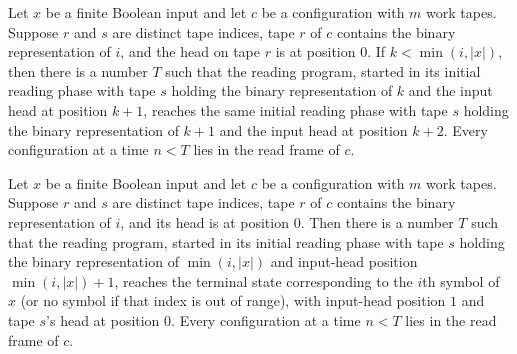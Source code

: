 \begin{theorem}
\label{Complexity.LogProg.read_advance}
\leanok
{}
Let $x$ be a finite Boolean input and let $c$ be a configuration with $m$ work tapes.
Suppose $r$ and $s$ are distinct tape indices, tape $r$ of $c$ contains the binary
representation of $i$, and the head on tape $r$ is at position $0$. If $k<\min(i,|x|)$,
then there is a number $T$ such that the reading program, started in its initial reading
phase with tape $s$ holding the binary representation of $k$ and the input head at
position $k+1$, reaches the same initial reading phase with tape $s$ holding the binary
representation of $k+1$ and the input head at position $k+2$. Every configuration at a
time $n<T$ lies in the read frame of $c$.
\end{theorem}

\begin{theorem}
\label{Complexity.LogProg.read_finish}
\leanok
{}
Let $x$ be a finite Boolean input and let $c$ be a configuration with $m$ work tapes.
Suppose $r$ and $s$ are distinct tape indices, tape $r$ of $c$ contains the binary
representation of $i$, and its head is at position $0$. Then there is a number $T$ such
that the reading program, started in its initial reading phase with tape $s$ holding the
binary representation of $\min(i,|x|)$ and input-head position $\min(i,|x|)+1$, reaches
the terminal state corresponding to the $i$th symbol of $x$ (or no symbol if that index
is out of range), with input-head position $1$ and tape $s$'s head at position $0$.
Every configuration at a time $n<T$ lies in the read frame of $c$.
\end{theorem}

